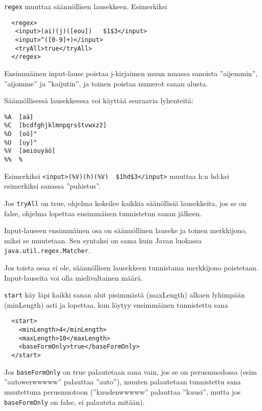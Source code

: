 \documentclass[12pt]{article}
\begin{document}


\verb|regex| muuttaa säännöllisen lausekkeen. Esimerkiksi

\begin{verbatim}
  <regex>
   <input>(ai)(j)([eou])   $1$3</input>
   <input>^([0-9]+)</input>
   <tryAll>true</tryAll>
  </regex>
\end{verbatim}

Ensimmäinen input-lause poistaa j-kirjaimen muun muassa sanoista
''aijemmin'', ''aijomme'' ja ''kaijutin'', ja toinen poistaa numerot
sanan alusta.


Säännöllisessä lausekkeessa voi käyttää seuraavia lyhenteitä:

\begin{verbatim}
%A  [aä]
%C  [bcdfghjklmnpqrsštvwxzž]
%O  [oö]"
%U  [uy]"
%V  [aeiouyäö]
%%  %
\end{verbatim}

Esimerkiksi \verb=<input>(%V)(h)(%V)  $1hd$3</input>=
muuttaa h:n hd:ksi esimerkiksi sanassa ''puhistus''.


Jos \verb=tryAll= on true, ohjelma kokeilee kaikkia säänöllisiä
lausekkeita, jos se on false, ohjelma lopettaa ensimmäisen tunnistetun
sanan jälkeen.

Input-lauseen ensimmäinen osa on säännöllinen lauseke ja toinen
merkkijono, miksi se muutetaan. Sen syntaksi on sama kuin Javan
luokassa \verb=java.util.regex.Matcher=.

Jos toista osaa ei ole, säännöllisen lausekkeen tunnistama merkkijono
poistetaan. Input-lauseita voi olla mielivaltainen määrä.




\bigskip
\verb=start= käy läpi kaikki sanan alut pisimmästä (maxLength) alkaen
lyhimpään (minLength) asti ja lopettaa, kun löytyy ensimmäinen
tunnistettu sana

\begin{verbatim}
  <start>
    <minLength>4</minLength>
    <maxLength>10</maxLength>
    <baseFormOnly>true</baseFormOnly>
  </start>
\end{verbatim}

Jos \verb=baseFormOnly= on true palautetaan sana vain, jos se on
perusmuodossa (esim ''autowerwwwww'' palauttaa ''auto''), muuten
palautetaan tunnistettu sana muutettuna perusmuotoon (''kuudenwwwww''
palauttaa ''kuusi'', mutta jos \verb=baseFormOnly= on false, ei
palauteta mitään).


\end{document}
